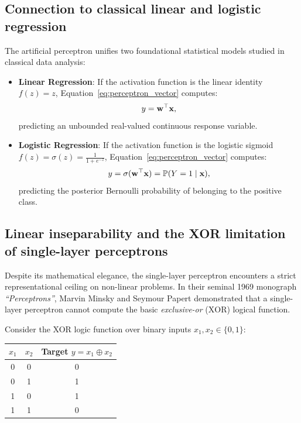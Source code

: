 \documentclass[../../main.tex]{subfiles}
\begin{document}
\subsection{Connection to classical linear and logistic regression}
The artificial perceptron unifies two foundational statistical models studied in classical data analysis:
\begin{itemize}
    \item \textbf{Linear Regression}: If the activation function is the linear identity $f(z) = z$, Equation~\eqref{eq:perceptron_vector} computes:
    \[
    y = \mathbf{w}^\top \mathbf{x},
    \]
    predicting an unbounded real-valued continuous response variable.
    \item \textbf{Logistic Regression}: If the activation function is the logistic sigmoid $f(z) = \sigma(z) = \frac{1}{1 + e^{-z}}$, Equation~\eqref{eq:perceptron_vector} computes:
    \[
    y = \sigma(\mathbf{w}^\top \mathbf{x}) = \mathbb{P}(Y = 1 \mid \mathbf{x}),
    \]
    predicting the posterior Bernoulli probability of belonging to the positive class.
\end{itemize}

\subsection{Linear inseparability and the XOR limitation of single-layer perceptrons}
\label{subsec:xor_inseparability}

Despite its mathematical elegance, the single-layer perceptron encounters a strict representational ceiling on non-linear problems. In their seminal 1969 monograph \textit{``Perceptrons''}, Marvin Minsky and Seymour Papert demonstrated that a single-layer perceptron cannot compute the basic \emph{exclusive-or} ($\text{XOR}$) logical function.

Consider the XOR logic function over binary inputs $x_1, x_2 \in \{0, 1\}$:
\begin{center}
\begin{tabular}{cc|c}
\toprule
$x_1$ & $x_2$ & Target $y = x_1 \oplus x_2$ \\
\midrule
0 & 0 & 0 \\
0 & 1 & 1 \\
1 & 0 & 1 \\
1 & 1 & 0 \\
\bottomrule
\end{tabular}
\end{center}
\end{document}
